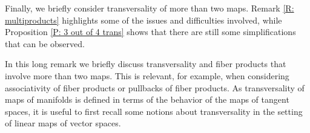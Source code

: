 Finally, we briefly consider transversality of more than two maps. Remark \ref{R: multiproducts} highlights some of the issues and difficulties involved, while Proposition \ref{P: 3 out of 4 trans} shows that there are still some simplifications that can be observed.

\begin{remark}\label{R: multiproducts}
	In this long remark we briefly discuss transversality and fiber products that involve more than two maps.
	This is relevant, for example, when considering associativity of fiber products or pullbacks of fiber products.
	As transversality of maps of manifolds is defined in terms of the behavior of the maps of tangent spaces, it is useful to first recall some notions about transversality in the setting of linear maps of vector spaces.


\end{remark}
